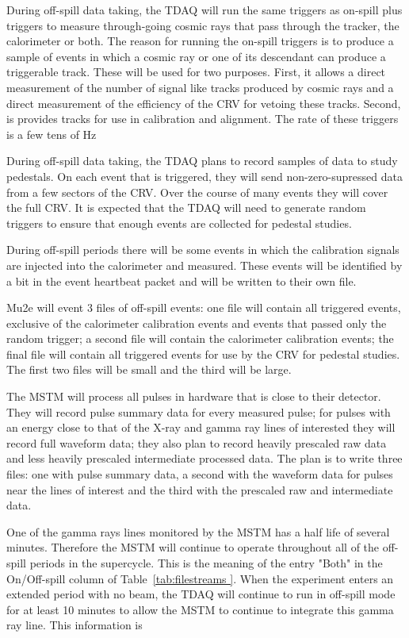 During off-spill data taking, the TDAQ will run the same triggers as on-spill plus triggers to measure through-going cosmic rays that pass through the tracker, the calorimeter or both.  The reason for running the on-spill triggers is to produce a sample of events in which a cosmic ray or one of its descendant can produce a triggerable track.  These will be used for two purposes. First, it allows a direct measurement of the number of signal like tracks produced by cosmic rays and a direct measurement of the efficiency of the CRV for vetoing these tracks.  Second, is provides tracks for use in calibration and alignment.  The rate of these triggers is a few tens of Hz

During off-spill data taking, the TDAQ plans to record samples of data to study pedestals. On each event that is triggered, they will send non-zero-supressed data from a few sectors of the CRV.  Over the course of many events they will cover the full CRV.  It is expected that the TDAQ will need to generate random triggers to ensure that enough events are collected for pedestal studies.
 
During off-spill periods there will be some events in which the calibration signals are injected into the calorimeter and measured.  These events will be identified by a bit in the event heartbeat packet and will be written to their own file.

Mu2e will event 3 files of off-spill events: one file will contain all triggered events, exclusive of the calorimeter calibration events and events that passed only the random trigger; a second file will contain the calorimeter calibration events; the final file will contain all triggered events for use by the CRV for pedestal studies.  The first two files will be small and the third will be large.

The MSTM will process all pulses in hardware that is close to their detector.  They will record
pulse summary data for every measured pulse; for pulses with an energy close to that of the X-ray and gamma ray lines of interested they will record full waveform data; they also plan to record heavily prescaled raw data and less heavily prescaled intermediate processed data. The plan is to write three files: one with pulse summary data, a second with the waveform data for pulses near the lines of interest and the third with the prescaled raw and intermediate data.

One of the gamma rays lines monitored by the MSTM has a half life of several minutes.  Therefore the MSTM will continue to operate throughout all of the off-spill periods in the supercycle.  This is the meaning of the entry "Both" in the On/Off-spill column of Table~\ref{tab:filestreams }.
When the experiment enters an extended period with no beam, the TDAQ will continue to run in off-spill mode for at least 10 minutes to allow the MSTM to continue to integrate this gamma ray line.  This information is 

